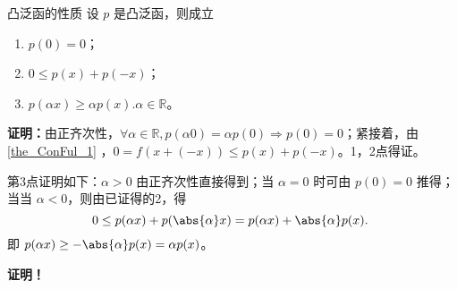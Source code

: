 \begin{theorem}{凸泛函的性质}
设 $p$ 是凸泛函，则成立
\begin{enumerate}
\item $p(0)=0$；
\item $0\leq p(x)+p(-x)$；
\item $p(\alpha x)\geq\alpha p(x).\alpha\in\mathbb R$。
\end{enumerate}
\end{theorem}

\textbf{证明：}由正齐次性，$\forall \alpha\in\mathbb R,p(\alpha 0)=\alpha p(0)\Rightarrow p(0)=0$；紧接着，由\autoref{the_ConFul_1} ，$0=f(x+(-x))\leq p(x)+p(-x)$。1，2点得证。

第3点证明如下：$\alpha>0$ 由正齐次性直接得到；当 $\alpha=0$ 时可由 $p(0)=0$ 推得；当当 $\alpha<0$，则由已证得的2，得
\begin{equation}
0\leq p(\alpha x)+p(\abs{\alpha} x)=p(\alpha x)+\abs{\alpha} p(x).~
\end{equation}
即 $p(\alpha x)\geq -\abs{\alpha}p(x)=\alpha p(x)$。



\textbf{证明！}








